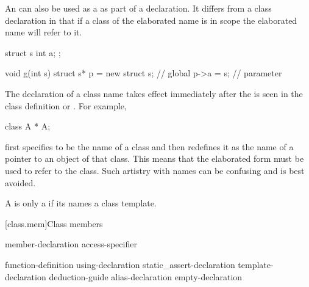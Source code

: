 \pnum
{}%
%
\begin{note}
An  can also
be used as a  as part of a declaration. It
differs from a class declaration in that if a class of the elaborated
name is in scope the elaborated name will refer to it.
\end{note}
\begin{example}

\begin{codeblock}
struct s { int a; };

void g(int s) {
  struct s* p = new struct s;   // global 
  p->a = s;                     // parameter 
}
\end{codeblock}
\end{example}

\pnum
{}%
\begin{note}
The declaration of a class name takes effect immediately after the
 is seen in the class definition or
. For example,

\begin{codeblock}
class A * A;
\end{codeblock}

first specifies  to be the name of a class and then redefines
it as the name of a pointer to an object of that class. This means that
the elaborated form   must be used to refer to the
class. Such artistry with names can be confusing and is best avoided.
\end{note}

\pnum
{}%
A  is only a 
if its  names a class template.

[class.mem]{Class members}%
%

\begin{bnf}
\br
    member-declaration \br
    access-specifier \terminal{:} 
\end{bnf}

\begin{bnf}
\br
       \terminal{;}\br
    function-definition\br
    using-declaration\br
    static_assert-declaration\br
    template-declaration\br
    deduction-guide\br
    alias-declaration\br
    empty-declaration
\end{bnf}

